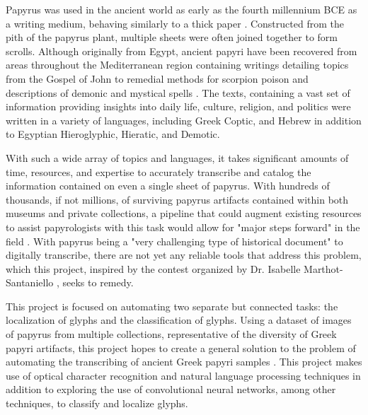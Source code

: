 Papyrus was used in the ancient world as early as the fourth millennium BCE as a writing medium, behaving similarly to a thick paper \cite{Houston}. Constructed from the pith of the papyrus plant, multiple sheets were often joined together to form scrolls. Although originally from Egypt, ancient papyri have been recovered from areas throughout the Mediterranean region containing writings detailing topics from the Gospel of John to remedial methods for scorpion poison and descriptions of demonic and mystical spells \cite{Comfort, Scorpion, Betz}. The texts, containing a vast set of information providing insights into daily life, culture, religion, and politics were written in a variety of languages, including Greek Coptic, and Hebrew in addition to Egyptian Hieroglyphic, Hieratic, and Demotic.

With such a wide array of topics and languages, it takes significant amounts of time, resources, and expertise to accurately transcribe and catalog the information contained on even a single sheet of papyrus. With hundreds of thousands, if not millions, of surviving papyrus artifacts contained within both museums and private collections, a pipeline that could augment existing resources to assist papyrologists with this task would allow for "major steps forward" in the field \cite{Contest}. With papyrus being a "very challenging type of historical document" to digitally transcribe, there are not yet any reliable tools that address this problem, which this project, inspired by the contest organized by Dr. Isabelle Marthot-Santaniello \cite{Contest}, seeks to remedy.

This project is focused on automating two separate but connected tasks: the localization of glyphs and the classification of glyphs. Using a dataset of images of papyrus from multiple collections, representative of the diversity of Greek papyri artifacts, this project hopes to create a general solution to the problem of automating the transcribing of ancient Greek papyri samples \cite{Contest}. This project makes use of optical character recognition and natural language processing techniques in addition to exploring the use of convolutional neural networks, among other techniques, to classify and localize glyphs.
